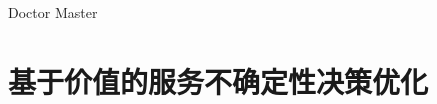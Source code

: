 \documentclass[cs4size,openany,UTF8]{ctexbook}
\begin{document}
\newif\ifxueweidoctor
\newif\ifxueweimaster
\def\temp{Doctor}
\ifx\temp\xuewei
  \xueweidoctortrue  \xueweimasterfalse
\fi
\def\temp{Master}
\ifx\temp\xuewei
  \xueweidoctorfalse  \xueweimastertrue
\fi




\chapter{基于价值的服务不确定性决策优化}





%
%
%
%
%



\addtolength{\bibsep}{-0.8em}
\nocite{*}

\end{document}
